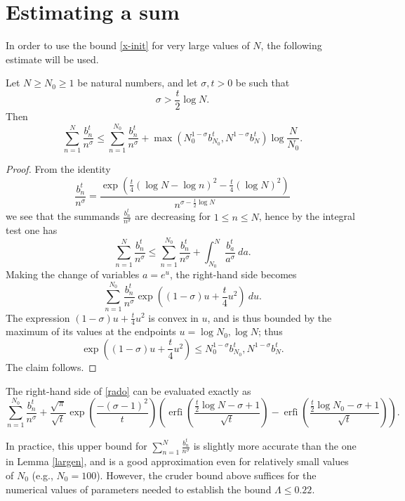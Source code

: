 \section{Estimating a sum}

In order to use the bound \eqref{x-init} for very large values of $N$, the following estimate will be used.

\begin{lemma}\label{largen}
Let $N \geq N_0 \geq 1$ be natural numbers, and let $\sigma,t > 0$ be such that
$$ \sigma > \frac{t}{2} \log N.$$
Then
$$ \sum_{n=1}^N \frac{b_n^t}{n^\sigma} \leq \sum_{n=1}^{N_0}
\frac{b_n^t}{n^\sigma}  + 
\max( N_0^{1-\sigma} b_{N_0}^t, N^{1-\sigma} b_N^t ) \log \frac{N}{N_0}.$$
\end{lemma}

\begin{proof}  From the identity
$$ \frac{b_n^t}{n^\sigma} = \frac{\exp\left( \frac{t}{4} (\log N - \log n)^2 - \frac{t}{4} (\log N)^2\right) }{n^{\sigma - \frac{t}{2} \log N}}$$
we see that the summands $\frac{b_n^t}{n^\sigma}$ are decreasing for $1 \leq n \leq N$, hence by the integral test one has
\begin{equation}\label{rado}
 \sum_{n=1}^N \frac{b_n^t}{n^\sigma} \leq \sum_{n=1}^{N_0}
\frac{b_n^t}{n^\sigma}  + \int_{N_0}^N \frac{b_a^t}{a^\sigma}\ da.
\end{equation}
Making the change of variables $a = e^u$, the right-hand side becomes
$$\sum_{n=1}^{N_0} \frac{b_n^t}{n^\sigma} \exp( (1-\sigma) u + \frac{t}{4} u^2 )\ du.$$
The expression $(1-\sigma) u + \frac{t}{4} u^2$ is convex in $u$, and is thus bounded by the maximum of its values at the endpoints $u = \log N_0, \log N$; thus
$$\exp( (1-\sigma) u + \frac{t}{4} u^2) \leq N_0^{1-\sigma} b_{N_0}^t, N^{1-\sigma} b_N^t.$$
The claim follows. 
\end{proof}

\begin{remark}  The right-hand side of \eqref{rado} can be evaluated exactly as
$$
\sum_{n=1}^{N_0}
\frac{b_n^t}{n^\sigma}  + \frac{\sqrt \pi}{\sqrt t} \exp(\frac{-(\sigma - 1)^2}{t}) \left( \operatorname{erfi}\left(\frac{\frac{t}{2} \log N  - \sigma + 1}{\sqrt t} \right) - \operatorname{erfi}\left(\frac{\frac{t}{2} \log N_0  - \sigma + 1}{\sqrt t}\right) \right).$$

In practice, this upper bound for $\sum_{n=1}^N \frac{b_n^t}{n^\sigma}$ is slightly more accurate than the one in Lemma \ref{largen}, and is a good approximation even for relatively small values of $N_0$ (e.g., $N_0=100$).  However, the cruder bound above suffices for the numerical values of parameters needed to establish the bound $\Lambda \leq 0.22$.
\end{remark}


